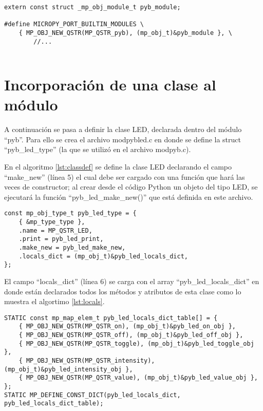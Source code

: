 \begin{lstlisting}[label={lst:moduledef},caption=Inclusión del módulo pyb a la lista de módulos disponibles.] 
extern const struct _mp_obj_module_t pyb_module;

#define MICROPY_PORT_BUILTIN_MODULES \
    { MP_OBJ_NEW_QSTR(MP_QSTR_pyb), (mp_obj_t)&pyb_module }, \
		//...
		
\end{lstlisting}


\section{Incorporación de una clase al módulo}

A continuación se pasa a definir la clase LED, declarada dentro del módulo “pyb”. Para ello se crea el archivo modpybled.c en donde se define la struct “pyb\_led\_type” (la que se utilizó en el archivo modpyb.c).

En el algoritmo \ref{lst:classdef} se define la clase LED declarando el campo “make\_new” (línea 5) el cual debe ser cargado con una función que hará las veces de constructor; al crear desde el código Python un objeto del tipo LED, se ejecutará la función “pyb\_led\_make\_new()” que está definida en este archivo.

\begin{lstlisting}[label={lst:classdef},caption=Estructura que define la clase LED.] 
const mp_obj_type_t pyb_led_type = {
    { &mp_type_type },
    .name = MP_QSTR_LED,
    .print = pyb_led_print,
    .make_new = pyb_led_make_new,
    .locals_dict = (mp_obj_t)&pyb_led_locals_dict,
};
\end{lstlisting}

El campo “locals\_dict” (línea 6) se carga con el array “pyb\_led\_locals\_dict” en donde están declarados todos los métodos y atributos de esta clase como lo muestra el algortimo \ref{lst:locals}.

\begin{lstlisting}[label={lst:locals},caption=Definición de métodos de la clase LED.] 
STATIC const mp_map_elem_t pyb_led_locals_dict_table[] = {
    { MP_OBJ_NEW_QSTR(MP_QSTR_on), (mp_obj_t)&pyb_led_on_obj },
    { MP_OBJ_NEW_QSTR(MP_QSTR_off), (mp_obj_t)&pyb_led_off_obj },
    { MP_OBJ_NEW_QSTR(MP_QSTR_toggle), (mp_obj_t)&pyb_led_toggle_obj },
    { MP_OBJ_NEW_QSTR(MP_QSTR_intensity), (mp_obj_t)&pyb_led_intensity_obj },
    { MP_OBJ_NEW_QSTR(MP_QSTR_value), (mp_obj_t)&pyb_led_value_obj },
};
STATIC MP_DEFINE_CONST_DICT(pyb_led_locals_dict,         pyb_led_locals_dict_table);
\end{lstlisting}

